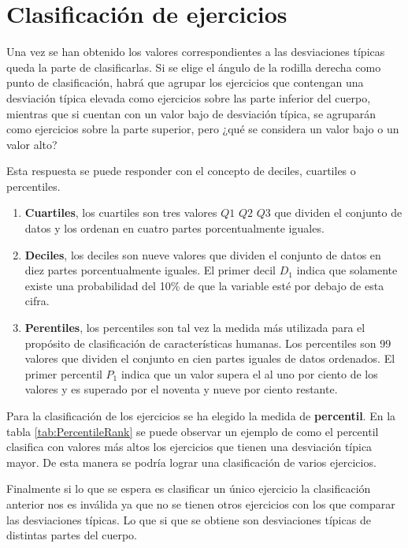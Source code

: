\newpage
\section{Clasificación de ejercicios}

Una vez se han obtenido los valores correspondientes a las desviaciones típicas queda la parte de clasificarlas. Si se elige el ángulo de la rodilla derecha como punto de clasificación, habrá que agrupar los ejercicios que contengan una desviación típica elevada como ejercicios sobre las parte inferior del cuerpo, mientras que si cuentan con un valor bajo de desviación típica, se agruparán como ejercicios sobre la parte superior, pero ¿qué se considera un valor bajo o un valor alto?

Esta respuesta se puede responder con el concepto de deciles, cuartiles o percentiles. 
\begin{enumerate}
    \item \textbf{Cuartiles}, los cuartiles son tres valores $Q1$ $Q2$ $Q3$ que dividen el conjunto de datos y los ordenan en cuatro partes porcentualmente iguales.
    \item \textbf{Deciles}, los deciles son nueve valores que dividen el conjunto de datos en diez partes porcentualmente iguales. El primer decil $D_1$ indica que solamente existe una probabilidad del 10\% de que la variable esté por debajo de esta cifra.
    \item \textbf{Perentiles}, los percentiles son tal vez la medida más utilizada para el propósito de clasificación de características humanas. Los percentiles son 99 valores que dividen el conjunto en cien partes iguales de datos ordenados. El primer percentil $P_1$ indica que un valor supera el al uno por ciento de los valores y es superado por el noventa y nueve por ciento restante.
\end{enumerate}



Para la clasificación de los ejercicios se ha elegido la medida de \textbf{percentil}. En la tabla \ref{tab:PercentileRank} se puede observar un ejemplo de como el percentil clasifica con valores más altos los ejercicios que tienen una desviación típica mayor. De esta manera se podría lograr una clasificación de varios ejercicios.

Finalmente si lo que se espera es clasificar un único ejercicio la clasificación anterior nos es inválida ya que no se tienen otros ejercicios con los que comparar las desviaciones típicas. Lo que si que se obtiene son desviaciones típicas de distintas partes del cuerpo.

